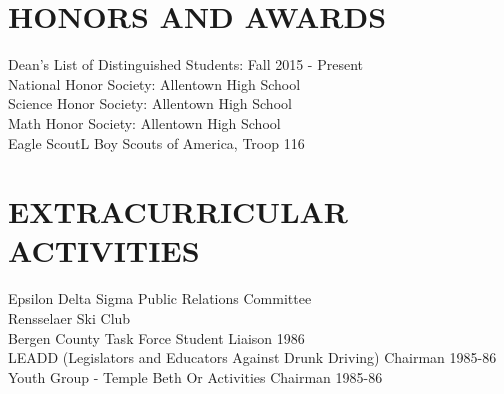 \documentclass{res}
\begin{document}
\begin{resume}
\section{HONORS AND AWARDS}          
    Dean's List of Distinguished Students: Fall 2015 - Present  \\        
    National Honor Society: Allentown High School  \\        
    Science Honor Society: Allentown High School  \\       
    Math Honor Society: Allentown High School\\ 
    Eagle ScoutL Boy Scouts of America, Troop 116
 
\section{EXTRACURRICULAR ACTIVITIES}          
    Epsilon Delta Sigma Public Relations Committee \\         
    Rensselaer Ski Club     \\     
    Bergen County Task Force Student Liaison 1986  \\        
    LEADD (Legislators and Educators Against Drunk Driving) Chairman
     1985-86  \\        
    Youth Group - Temple Beth Or Activities Chairman 1985-86          
 
\end{resume}
\end{document}
